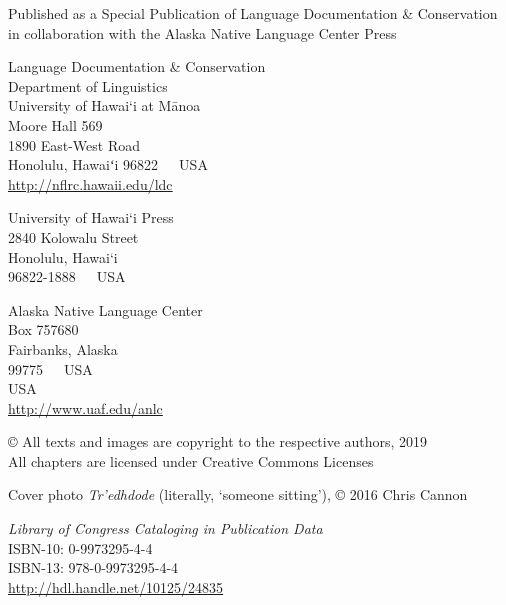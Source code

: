 \thispagestyle{empty}
{\parindent0pt
\raggedright
\fontsize{11pt}{12pt}\selectfont


Published as a Special Publication of Language Documentation \& Conservation\\
in collaboration with the Alaska Native Language Center Press\\

\vspace*{0.1\textheight}

Language Documentation \& Conservation\\
Department of Linguistics\\
University of Hawai‘i at Mānoa\\
Moore Hall 569\\
1890 East-West Road\\
Honolulu, Hawaiʻi 96822\ \ \ USA\\[2\baselineskip]

\url{http://nflrc.hawaii.edu/ldc}\\[2\baselineskip]

\begin{multicols}{2}
University of Hawai‘i Press\\
2840 Kolowalu Street\\
Honolulu, Hawai‘i\\
96822-1888\ \ \ USA

\columnbreak

Alaska Native Language Center\\
Box 757680\\
Fairbanks, Alaska\\
99775\ \ \ USA\\
USA\\ %
\url{http://www.uaf.edu/anlc}\\[2\baselineskip]

\end{multicols}

\vfill

\copyright{} All texts and images are copyright to the respective authors, 2019\\
All chapters are licensed under Creative Commons Licenses\\[\baselineskip]

\vspace*{0.5cm}

Cover photo \textit{Tr'edhdode} (literally, `someone sitting'), \copyright{} 2016 Chris Cannon\\[\baselineskip]

\vspace*{1cm}

\textit{Library of Congress Cataloging in Publication Data}\\[2pt]
ISBN-10: 0-9973295-4-4\\
ISBN-13: 978-0-9973295-4-4\\[\baselineskip]

\url{http://hdl.handle.net/10125/24835}

}
